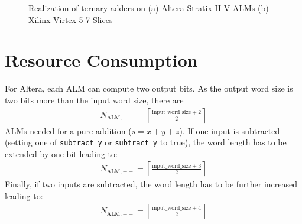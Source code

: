 \documentclass[a4paper,BCOR7mm,12pt,pointlessnumbers,bibtotoc]{scrartcl}
\newcommand{\ceil}[1]{\left\lceil #1 \right\rceil} %
\begin{document}
\begin{figure}[!h]
\centering
	\begin{subfigure}[c]{\columnwidth}
	  \centering
		\caption{}
		\label{fig:ternary_adder_stratix}
	\end{subfigure}
	\begin{subfigure}[c]{\columnwidth}
	  \centering
		\caption{}
		\label{fig:ternary_adder_virtex_5_6_7}
	\end{subfigure}
 \caption{Realization of ternary adders 
 on
 (a) Altera Stratix II-V ALMs (b) Xilinx Virtex 5-7 Slices}
 \label{fig:ternary_adders}
\end{figure}

\section{Resource Consumption}

For Altera, each ALM can compute two output bits. As the output word size is two bits more than the input word size, there are 
\begin{align}
	N_{\text{ALM},++} = \ceil{\frac{\text{input\_word\_size}+2}{2}} 
\end{align}
ALMs needed for a pure addition ($s = x + y + z$). If one input is subtracted (setting one of \verb|subtract_y| or \verb|subtract_y| to true), the word length has to be extended by one bit leading to:
\begin{align}
	N_{\text{ALM},+-} = \ceil{\frac{\text{input\_word\_size}+3}{2}}
\end{align}
Finally, if two inputs are subtracted, the word length has to be further increased leading to:
\begin{align}
	N_{\text{ALM},--} = \ceil{\frac{\text{input\_word\_size}+4}{2}} 
\end{align}
\end{document}
